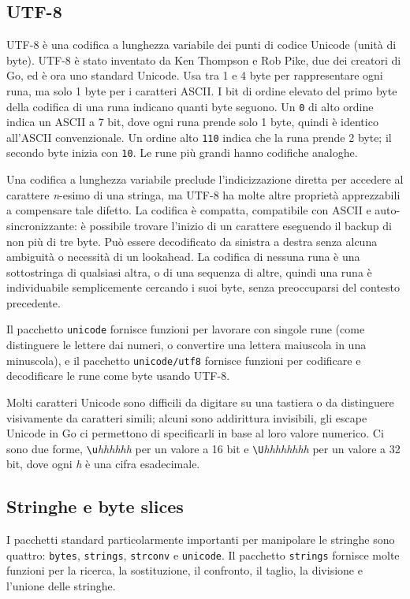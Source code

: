 \subsection{UTF-8}
\label{subsec:utf8}%
UTF-8 è una codifica a lunghezza variabile dei punti di codice Unicode (unità di byte).
UTF-8 è stato inventato da Ken Thompson e Rob Pike, due dei creatori di Go, ed è ora uno standard Unicode.
Usa tra 1 e 4 byte per rappresentare ogni runa, ma solo 1 byte per i caratteri ASCII\@.
I bit di ordine elevato del primo byte della codifica di una runa indicano quanti byte seguono.
Un \verb|0| di alto ordine indica un ASCII a 7 bit, dove ogni runa prende solo 1 byte, quindi è identico all'ASCII convenzionale.
Un ordine alto \verb|110| indica che la runa prende 2 byte;
il secondo byte inizia con \verb|10|.
Le rune più grandi hanno codifiche analoghe.

Una codifica a lunghezza variabile preclude l'indicizzazione diretta per accedere al carattere \textit{n}-esimo di una stringa, ma UTF-8 ha molte altre proprietà apprezzabili a compensare tale difetto.
La codifica è compatta, compatibile con ASCII e auto-sincronizzante: è possibile trovare l'inizio di un carattere eseguendo il backup di non più di tre byte.
Può essere decodificato da sinistra a destra senza alcuna ambiguità o necessità di un lookahead.
La codifica di nessuna runa è una sottostringa di qualsiasi altra, o di una sequenza di altre, quindi una runa è individuabile semplicemente cercando i suoi byte, senza preoccuparsi del contesto precedente.

Il pacchetto \verb|unicode| fornisce funzioni per lavorare con singole rune (come distinguere le lettere dai numeri, o convertire una lettera maiuscola in una minuscola), e il pacchetto \verb|unicode/utf8| fornisce funzioni per codificare e decodificare le rune come byte usando UTF-8.

Molti caratteri Unicode sono difficili da digitare su una tastiera o da distinguere visivamente da caratteri simili;
alcuni sono addirittura invisibili, gli escape Unicode in Go ci permettono di specificarli in base al loro valore numerico.
Ci sono due forme, \verb|\u|\textit{hhhhhh} per un valore a 16 bit e \verb|\U|\textit{hhhhhhhh} per un valore a 32 bit, dove ogni \textit{h} è una cifra esadecimale.

\subsection{Stringhe e byte slices}
\label{subsec:stringhe_e_byte_slices}%
I pacchetti standard particolarmente importanti per manipolare le stringhe sono quattro: \verb|bytes|, \verb|strings|, \verb|strconv| e \verb|unicode|.
Il pacchetto \verb|strings| fornisce molte funzioni per la ricerca, la sostituzione, il confronto, il taglio, la divisione e l'unione delle stringhe.

